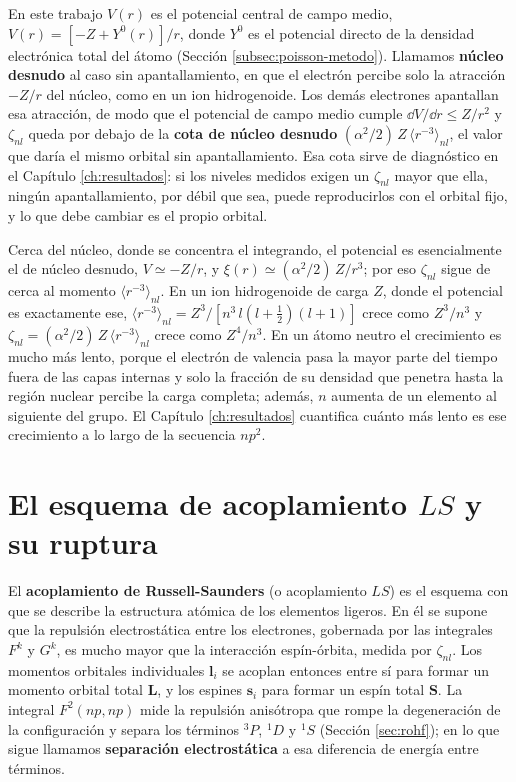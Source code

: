 En este trabajo $V(r)$ es el potencial central de campo medio, $V(r) = [-Z + Y^0(r)]/r$, donde $Y^0$ es el potencial directo de la densidad electrónica total del átomo (Sección \ref{subsec:poisson-metodo}). Llamamos \textbf{núcleo desnudo} al caso sin apantallamiento, en que el electrón percibe solo la atracción $-Z/r$ del núcleo, como en un ion hidrogenoide. Los demás electrones apantallan esa atracción, de modo que el potencial de campo medio cumple $\dd V/\dd r \le Z/r^2$ y $\zeta_{nl}$ queda por debajo de la \textbf{cota de núcleo desnudo} $(\alpha^2/2)\,Z\,\langle r^{-3}\rangle_{nl}$, el valor que daría el mismo orbital sin apantallamiento. Esa cota sirve de diagnóstico en el Capítulo \ref{ch:resultados}: si los niveles medidos exigen un $\zeta_{nl}$ mayor que ella, ningún apantallamiento, por débil que sea, puede reproducirlos con el orbital fijo, y lo que debe cambiar es el propio orbital.

Cerca del núcleo, donde se concentra el integrando, el potencial es esencialmente el de núcleo desnudo, $V \simeq -Z/r$, y $\xi(r) \simeq (\alpha^2/2)\,Z/r^3$; por eso $\zeta_{nl}$ sigue de cerca al momento $\langle r^{-3}\rangle_{nl}$. En un ion hidrogenoide de carga $Z$, donde el potencial es exactamente ese, $\langle r^{-3}\rangle_{nl} = Z^3/[n^3\,l(l+\tfrac{1}{2})(l+1)]$ crece como $Z^3/n^3$ y $\zeta_{nl} = (\alpha^2/2)\,Z\,\langle r^{-3}\rangle_{nl}$ crece como $Z^4/n^3$. En un átomo neutro el crecimiento es mucho más lento, porque el electrón de valencia pasa la mayor parte del tiempo fuera de las capas internas y solo la fracción de su densidad que penetra hasta la región nuclear percibe la carga completa; además, $n$ aumenta de un elemento al siguiente del grupo. El Capítulo \ref{ch:resultados} cuantifica cuánto más lento es ese crecimiento a lo largo de la secuencia $np^2$.

\section{El esquema de acoplamiento \texorpdfstring{$LS$}{LS} y su ruptura}
\label{sec:acoplamiento_ls}

El \textbf{acoplamiento de Russell-Saunders} (o acoplamiento $LS$) es el esquema con que se describe la estructura atómica de los elementos ligeros. En él se supone que la repulsión electrostática entre los electrones, gobernada por las integrales $F^k$ y $G^k$, es mucho mayor que la interacción espín-órbita, medida por $\zeta_{nl}$. Los momentos orbitales individuales $\mathbf{l}_i$ se acoplan entonces entre sí para formar un momento orbital total $\mathbf{L}$, y los espines $\mathbf{s}_i$ para formar un espín total $\mathbf{S}$. La integral $F^2(np, np)$ mide la repulsión anisótropa que rompe la degeneración de la configuración y separa los términos $^3P$, $^1D$ y $^1S$ (Sección \ref{sec:rohf}); en lo que sigue llamamos \textbf{separación electrostática} a esa diferencia de energía entre términos.

